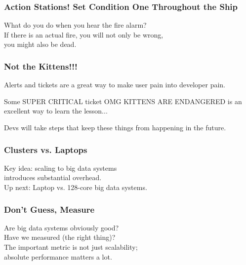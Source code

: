 \begin{frame}
\frametitle{Action Stations! Set Condition One Throughout the Ship}

\large
\begin{changemargin}{1cm}
What do you do when you hear the fire alarm?\\[1em]




If there is an actual fire, you will not only be wrong, \\
you might also be dead.
\end{changemargin}
\end{frame}



\begin{frame}
\frametitle{Not the Kittens!!!}

\large
\begin{changemargin}{1cm}
Alerts and tickets are a great way to make user pain into developer pain.

Some SUPER CRITICAL ticket OMG KITTENS ARE ENDANGERED is an excellent way to learn the lesson... 

Devs will take steps that keep these things from happening in the future.
\end{changemargin}
\end{frame}



\begin{frame}
\frametitle{Clusters vs. Laptops}

\Large
\begin{changemargin}{1cm}
Key idea: scaling to big data systems \\
introduces substantial overhead. \\[1em]
Up next: Laptop vs. 128-core big data systems.
\end{changemargin}

\end{frame}



\begin{frame}
\frametitle{Don't Guess, Measure}

\Large
\begin{changemargin}{1cm}
Are big data systems obviously good?\\
Have we measured (the right thing)?\\[1em]

The important metric is not just scalability; \\
absolute performance matters a lot. 

\end{changemargin}

\end{frame}



